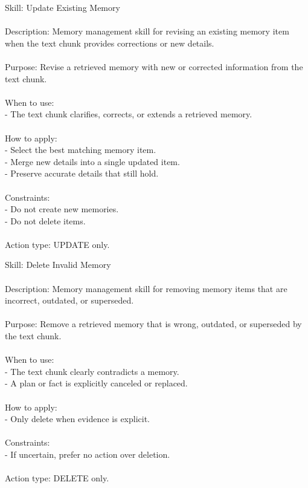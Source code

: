 \begin{center}
\begin{tcolorbox}[title={Initial Primitive Skill - UPDATE}]
{
Skill: Update Existing Memory \\\\
Description: Memory management skill for revising an existing memory item when the text chunk provides corrections or new details. \\\\
Purpose: Revise a retrieved memory with new or corrected information from the text chunk. \\\\
When to use: \\
- The text chunk clarifies, corrects, or extends a retrieved memory. \\\\
How to apply: \\
- Select the best matching memory item. \\
- Merge new details into a single updated item. \\
- Preserve accurate details that still hold. \\\\
Constraints: \\
- Do not create new memories. \\
- Do not delete items. \\\\
Action type: UPDATE only.
}
\label{appendix:case_update}
\end{tcolorbox}
\end{center}





\begin{center}
\begin{tcolorbox}[title={Initial Primitive Skill - DELETE}]
{
Skill: Delete Invalid Memory \\\\
Description: Memory management skill for removing memory items that are incorrect, outdated, or superseded. \\\\
Purpose: Remove a retrieved memory that is wrong, outdated, or superseded by the text chunk. \\\\
When to use: \\
- The text chunk clearly contradicts a memory. \\
- A plan or fact is explicitly canceled or replaced. \\\\
How to apply: \\
- Only delete when evidence is explicit. \\\\
Constraints: \\
- If uncertain, prefer no action over deletion. \\\\
Action type: DELETE only.
}
\label{appendix:case_delete}
\end{tcolorbox}
\end{center}




